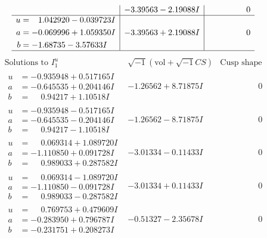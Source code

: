 \documentclass[1p]{elsarticle_modified}
\theoremstyle{definition}
\newcommand{\I}{\sqrt{-1}}
\begin{document}
$$\begin{array}{c|c|c}
 & -3.39563 - 2.19088 I & \phantom{-0.000000 } 0 \\ \hline\begin{aligned}
u &= \phantom{-}1.042920 - 0.039723 I \\
a &= -0.069996 + 1.059350 I \\
b &= -1.68735 - 3.57633 I\end{aligned}
 & -3.39563 + 2.19088 I & \phantom{-0.000000 } 0\\
 \hline 
 \end{array}$$\newpage$$\begin{array}{c|c|c}  
\text{Solutions to }I^u_{1}& \I (\text{vol} + \sqrt{-1}CS) & \text{Cusp shape}\\
 \hline 
\begin{aligned}
u &= -0.935948 + 0.517165 I \\
a &= -0.645535 + 0.204146 I \\
b &= \phantom{-}0.94217 + 1.10518 I\end{aligned}
 & -1.26562 + 8.71875 I & \phantom{-0.000000 } 0 \\ \hline\begin{aligned}
u &= -0.935948 - 0.517165 I \\
a &= -0.645535 - 0.204146 I \\
b &= \phantom{-}0.94217 - 1.10518 I\end{aligned}
 & -1.26562 - 8.71875 I & \phantom{-0.000000 } 0 \\ \hline\begin{aligned}
u &= \phantom{-}0.069314 + 1.089720 I \\
a &= -1.110850 + 0.091728 I \\
b &= \phantom{-}0.989033 + 0.287582 I\end{aligned}
 & -3.01334 - 0.11433 I & \phantom{-0.000000 } 0 \\ \hline\begin{aligned}
u &= \phantom{-}0.069314 - 1.089720 I \\
a &= -1.110850 - 0.091728 I \\
b &= \phantom{-}0.989033 - 0.287582 I\end{aligned}
 & -3.01334 + 0.11433 I & \phantom{-0.000000 } 0 \\ \hline\begin{aligned}
u &= \phantom{-}0.769753 + 0.479609 I \\
a &= -0.283950 + 0.796787 I \\
b &= -0.231751 + 0.208273 I\end{aligned}
 & -0.51327 - 2.35678 I & \phantom{-0.000000 } 0 \\ \hline\begin{aligned}

\end{aligned}
\end{array}$$
\end{document}
